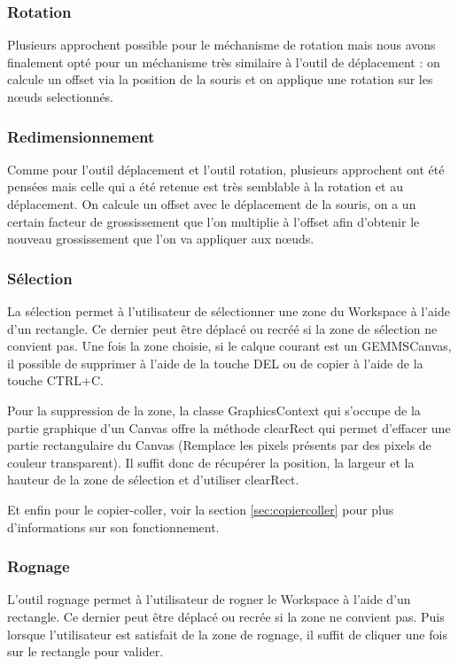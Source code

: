 \subsubsection{Rotation}
Plusieurs approchent possible pour le méchanisme de rotation mais nous avons finalement opté pour un méchanisme très similaire à l'outil de déplacement : on calcule un offset via la position de la souris et on applique une rotation sur les n\oe uds selectionnés.
\subsubsection{Redimensionnement}
Comme pour l'outil déplacement et l'outil rotation, plusieurs approchent ont été pensées mais celle qui a été retenue est très semblable à la rotation et au déplacement. On calcule un offset avec le déplacement de la souris, on a un certain facteur de grossissement que l'on multiplie à l'offset afin d'obtenir le nouveau grossissement que l'on va appliquer aux n\oe uds.
\subsubsection{Sélection}
\label{sec:selection}
La sélection permet à l'utilisateur de sélectionner une zone du Workspace à l'aide d'un rectangle. Ce dernier peut être déplacé ou recréé si la zone de sélection ne convient pas. Une fois la zone choisie, si le calque courant est un GEMMSCanvas, il possible de supprimer à l'aide de la touche DEL ou de copier à l'aide de la touche CTRL+C.

Pour la suppression de la zone, la classe GraphicsContext qui s'occupe de la partie graphique d'un Canvas offre la méthode clearRect qui permet d'effacer une partie rectangulaire du Canvas (Remplace les pixels présents par des pixels de couleur transparent). Il suffit donc de récupérer la position, la largeur et la hauteur de la zone de sélection et d'utiliser clearRect.

Et enfin pour le copier-coller, voir la section \ref{sec:copiercoller} pour plus d'informations sur son fonctionnement.

\subsubsection{Rognage}
L'outil rognage permet à l'utilisateur de rogner le Workspace à l'aide d'un rectangle. Ce dernier peut être déplacé ou recrée si la zone ne convient pas. Puis lorsque l'utilisateur est satisfait de la zone de rognage, il suffit de cliquer une fois sur le rectangle pour valider.

